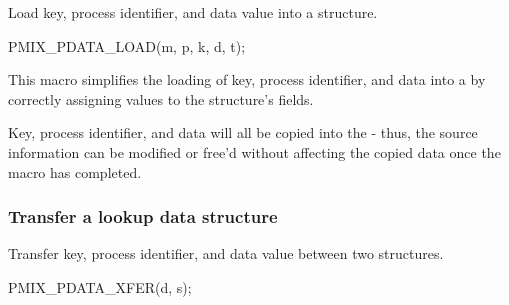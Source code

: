 \summary

Load key, process identifier, and data value into a  structure.

\cspecificstart
\begin{codepar}
PMIX_PDATA_LOAD(m, p, k, d, t);
\end{codepar}
\cspecificend

\begin{arglist}
\end{arglist}

This macro simplifies the loading of key, process identifier, and data into a  by correctly assigning values to the structure's fields.

\adviceuserstart
Key, process identifier, and data will all be copied into the  - thus, the source information can be modified or free'd without affecting the copied data once the macro has completed.
\adviceuserend

\subsubsection{Transfer a lookup data structure}

\summary

Transfer key, process identifier, and data value between two  structures.

\cspecificstart
\begin{codepar}
PMIX_PDATA_XFER(d, s);
\end{codepar}
\cspecificend

\begin{arglist}
\end{arglist}

